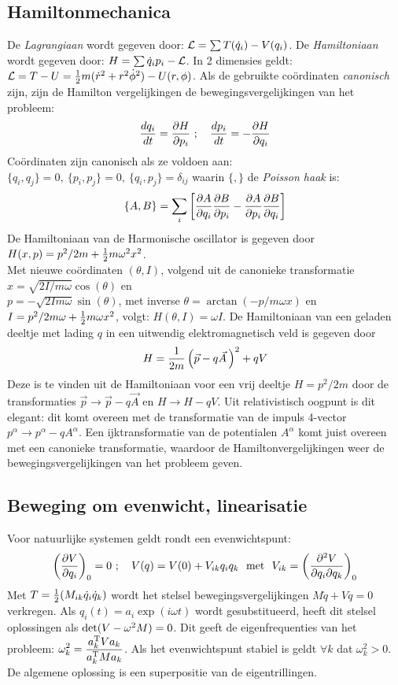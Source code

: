 \subsection{Hamiltonmechanica}
De {\it Lagrangiaan} wordt gegeven door: ${\cal L}=\sum T(\dot{q}_i)-V(q_i)$.
De {\it Hamiltoniaan} wordt gegeven door: $H=\sum\dot{q}_ip_i-{\cal L}$. In 2
dimensies geldt: ${\cal L}=T-U=\mbox{$\frac{1}{2}$} m(\dot{r}^2+r^2\dot{\phi}^2)-U(r,\phi)$.
\npar
Als de gebruikte co\"ordinaten {\it canonisch} zijn, zijn de Hamilton
vergelijkingen de bewegingsvergelijkingen van het probleem:
\[
\frac{dq_i}{dt}=\frac{\partial H}{\partial p_i}~;~~~\frac{dp_i}{dt}=-\frac{\partial H}{\partial q_i}
\]
Co\"ordinaten zijn canonisch als ze voldoen aan:
$\{q_i,q_j\}=0,~\{p_i,p_j\}=0,~\{q_i,p_j\}=\delta_{ij}$ waarin $\{,\}$ de
{\it Poisson haak} is:
\[
\{A,B\}=\sum\limits_i\left[\frac{\partial A}{\partial q_i}\frac{\partial B}{\partial p_i}-\frac{\partial A}{\partial p_i}\frac{\partial B}{\partial q_i}\right]
\]
De Hamiltoniaan van de Harmonische oscillator is gegeven door
$H(x,p)=p^2/2m+\mbox{$\frac{1}{2}$} m\omega^2 x^2$.\\ Met nieuwe co\"ordinaten $(\theta,I)$,
volgend uit de canonieke transformatie $x=\sqrt{2I/m\omega}\cos(\theta)$ en\\
$p=-\sqrt{2Im\omega}\sin(\theta)$, met inverse $\theta=\arctan(-p/m\omega x)$
en $I=p^2/2m\omega+\mbox{$\frac{1}{2}$} m\omega x^2$, volgt: $H(\theta,I)=\omega I$.
\npar
De Hamiltoniaan van een geladen deeltje met lading $q$ in een uitwendig
elektromagnetisch veld is gegeven door
\[
H=\frac{1}{2m}\left(\vec{p}-q\vec{A}\,\right)^2+qV
\]
Deze is te vinden uit de Hamiltoniaan voor een vrij deeltje $H=p^2/2m$
door de transformaties $\vec{p}\rightarrow\vec{p}-q\vec{A}$ en
$H\rightarrow H-qV$. Uit relativistisch oogpunt is dit elegant: dit komt
overeen met de transformatie van de impuls 4-vector
$p^\alpha\rightarrow p^\alpha-qA^\alpha$. Een ijktransformatie van de
potentialen $A^\alpha$ komt juist overeen met een canonieke transformatie,
waardoor de Hamiltonvergelijkingen weer de bewegingsvergelijkingen van het
probleem geven.

\subsection{Beweging om evenwicht, linearisatie}
Voor natuurlijke systemen geldt rondt een evenwichtspunt:
\[
\left(\frac{\partial V}{\partial q_i}\right)_0=0~;~~~V(q)=V(0)+V_{ik}q_iq_k\mbox{~~met~~}
V_{ik}=\left(\frac{\partial^2V}{\partial q_i\partial q_k}\right)_0
\]
Met $T=\mbox{$\frac{1}{2}$}(M_{ik}\dot{q}_i\dot{q}_k)$ wordt het stelsel
bewegingsvergelijkingen $M\ddot{q}+Vq=0$ verkregen. Als
$q_i(t)=a_i\exp(i\omega t)$ wordt gesubstitueerd, heeft dit stelsel
oplossingen als ${\rm det}(V-\omega^2 M)=0$. Dit geeft de eigenfrequenties
van het probleem: $\displaystyle\omega^2_k=\frac{a_k^{\rm T}Va_k}{a_k^{\rm T}Ma_k}$.
Als het evenwichtspunt stabiel is geldt $\forall k$ dat $\omega^2_k>0$. De
algemene oplossing is een superpositie van de eigentrillingen.

